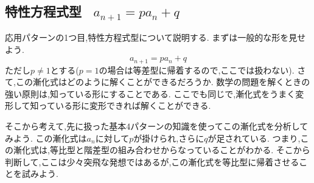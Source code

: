 
\subsection{特性方程式型 \, $a_{n+1}=pa_n+q$}
  応用パターンの1つ目,特性方程式型について説明する.
  まずは一般的な形を見せよう.
  \[
    a_{n+1}=pa_n+q
  \]
  ただし$p\ne1$とする($p=1$の場合は等差型に帰着するので,ここでは扱わない).
  さて,この漸化式はどのように解くことができるだろうか.
  数学の問題を解くときの強い原則は,知っている形にすることである.
  ここでも同じで,漸化式をうまく変形して知っている形に変形できれば解くことができる.
  
  そこから考えて,先に扱った基本4パターンの知識を使ってこの漸化式を分析してみよう.
  この漸化式は$a_n$に対して$p$が掛けられ,さらに$q$が足されている.
  つまり,この漸化式は,等比型と階差型の組み合わせからなっていることがわかる.
  そこから判断して,ここは少々突飛な発想ではあるが,この漸化式を等比型に帰着させることを試みよう.
  

